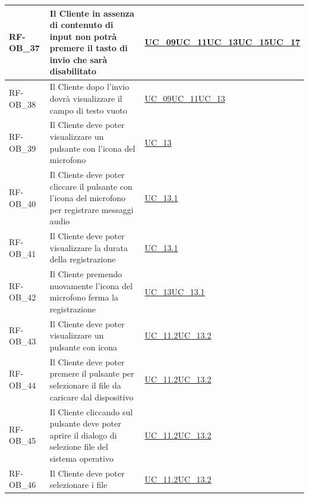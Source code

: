 \begin{longtable}{|>{\raggedright}p{}|>{\raggedright\arraybackslash}p{}|>{\raggedright\arraybackslash}p{}|}
	\hline
	RF-OB\_37 \hypertarget{rf-ob_37} & Il Cliente in assenza di contenuto di input non potrà premere il tasto di invio che sarà disabilitato & \hyperref[uc_09]{UC\_09}\newline \hyperref[uc_11]{UC\_11}\newline \hyperref[uc_13]{UC\_13}\newline \hyperref[uc_15]{UC\_15}\newline \hyperref[uc_17]{UC\_17} \\
	\hline
	RF-OB\_38 \hypertarget{rf-ob_38} & Il Cliente dopo l'invio dovrà visualizzare il campo di testo vuoto & \hyperref[uc_09]{UC\_09}\newline \hyperref[uc_11]{UC\_11}\newline \hyperref[uc_13]{UC\_13} \\
	\hline
	RF-OB\_39 \hypertarget{rf-ob_39} & Il Cliente deve poter visualizzare un pulsante con l'icona del microfono & \hyperref[uc_13]{UC\_13} \\
	\hline
	RF-OB\_40 \hypertarget{rf-ob_40} & Il Cliente deve poter cliccare il pulsante con l'icona del microfono per registrare messaggi audio & \hyperref[uc_13.1]{UC\_13.1} \\
	\hline
	RF-OB\_41 \hypertarget{rf-ob_41} & Il Cliente deve poter visualizzare la durata della registrazione & \hyperref[uc_13.1]{UC\_13.1} \\
	\hline
	RF-OB\_42 \hypertarget{rf-ob_42} & Il Cliente premendo nuovamente l'icona del microfono ferma la registrazione & \hyperref[uc_13]{UC\_13}\newline \hyperref[uc_13.1]{UC\_13.1} \\
	\hline
	RF-OB\_43 \hypertarget{rf-ob_43} & Il Cliente deve poter visualizzare un pulsante con icona \vr{clip} & \hyperref[uc_11.2]{UC\_11.2}\newline \hyperref[uc_13.2]{UC\_13.2} \\
	\hline
	RF-OB\_44 \hypertarget{rf-ob_44} & Il Cliente deve poter premere il pulsante per selezionare il file da caricare dal dispositivo & \hyperref[uc_11.2]{UC\_11.2}\newline \hyperref[uc_13.2]{UC\_13.2} \\
	\hline
	RF-OB\_45 \hypertarget{rf-ob_45} & Il Cliente cliccando sul pulsante deve poter aprire il dialogo di selezione file del sistema operativo & \hyperref[uc_11.2]{UC\_11.2}\newline \hyperref[uc_13.2]{UC\_13.2} \\
	\hline
	RF-OB\_46 \hypertarget{rf-ob_46} & Il Cliente deve poter selezionare i file & \hyperref[uc_11.2]{UC\_11.2}\newline \hyperref[uc_13.2]{UC\_13.2} \\

\end{longtable}
